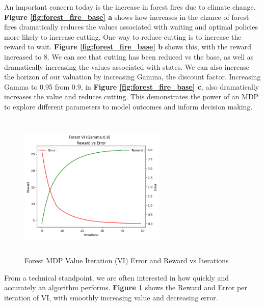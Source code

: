 \documentclass[letterpaper]{article} %
\begin{document}
An important concern today is the increase in forest fires due to climate change.  \textbf{Figure \ref{fig:forest_fire_base} a} shows how increases in the chance of forest fires dramatically reduces the values associated with waiting and optimal policies more likely to increase cutting.  One way to reduce cutting is to increase the reward to wait.   \textbf{Figure \ref{fig:forest_fire_base} b} shows this, with the reward increased to 8.  We can see that cutting has been reduced vs the base, as well as dramatically increasing the values associated with states.  We can also increase the horizon of our valuation by increasing Gamma, the discount factor.  Increasing Gamma to 0.95 from 0.9, in \textbf{Figure \ref{fig:forest_fire_base} c}, also dramatically increases the value and reduces cutting.  This demonstrates the power of an MDP to explore different parameters to model outcomes and inform decision making.


\begin{figure}[!htb]
\centering
\includegraphics[width=2.75in, height=2.75in]{Figures/Forest_VI_Gamma_0_9_Reward_vs_Error.png}
\caption{Forest MDP Value Iteration (VI) Error and Reward vs Iterations}
\label{fig:forest_vi_reward_error}
\end{figure}
From a technical standpoint, we are often interested in how quickly and accurately an algorithm performs. \textbf{Figure \ref{fig:forest_vi_reward_error}} shows the Reward and Error per iteration of VI, with smoothly increasing value and decreasing error.  
\end{document}

